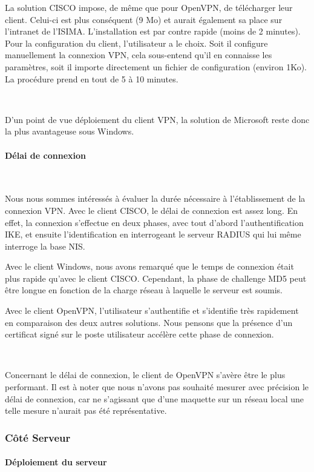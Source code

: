 La solution CISCO impose, de même que pour OpenVPN, de télécharger leur client. Celui-ci est plus conséquent (9 Mo) et aurait également sa place sur l'intranet de l'ISIMA. L'installation est par contre rapide (moins de 2 minutes). Pour la configuration du client, l'utilisateur a le choix. Soit il configure manuellement la connexion VPN, cela sous-entend qu'il en connaisse les paramètres, soit il importe directement un fichier de configuration (environ 1Ko). La procédure prend en tout de 5 à 10 minutes.

~

D'un point de vue déploiement du client VPN, la solution de Microsoft reste donc la plus avantageuse sous Windows.

\paragraph{Délai de connexion}
~\

Nous nous sommes intéressés à évaluer la durée nécessaire à l'établissement de la connexion VPN. Avec le client CISCO, le délai de connexion est assez long. En effet, la connexion s'effectue en deux phases, avec tout d'abord l'authentification IKE, et ensuite l'identification en interrogeant le serveur RADIUS qui lui même interroge la base NIS.

Avec le client Windows, nous avons remarqué que le temps de connexion était plus rapide qu'avec le client CISCO. Cependant, la phase de challenge MD5 peut être longue en fonction de la charge réseau à laquelle le serveur est soumis.

Avec le client OpenVPN, l'utilisateur s'authentifie et s'identifie très rapidement en comparaison des deux autres solutions. Nous pensons que la présence d'un certificat signé sur le poste utilisateur accélère cette phase de connexion.

~

Concernant le délai de connexion, le client de OpenVPN s'avère être le plus performant. Il est à noter que nous n'avons pas souhaité mesurer avec précision le délai de connexion, car ne s'agissant que d'une maquette sur un réseau local une telle mesure n'aurait pas été représentative.

\subsubsection{Côté Serveur}

\paragraph{Déploiement du serveur}
~

